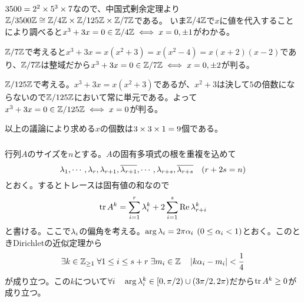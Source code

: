 \newpage

\setcounter{subsubsection}{3}
\subsubsection{} %
\begin{sol}
$3500 = 2^2 \times 5^3 \times 7$なので、中国式剰余定理より${\mathbb Z} / 3500 {\mathbb Z} \cong {\mathbb Z} / 4{\mathbb Z} \times {\mathbb Z} / 125 {\mathbb Z} \times {\mathbb Z} / 7{\mathbb Z}$である。
いま${\mathbb Z} / 4{\mathbb Z}$で$x$に値を代入することにより調べると$x^3 + 3x = 0 \in {\mathbb Z} / 4 {\mathbb Z} \iff x = 0, \pm 1$がわかる。

${\mathbb Z} / 7 {\mathbb Z}$で考えると$x^3 + 3x = x(x^2 + 3) = x(x^2 - 4)= x(x+2)(x-2)$であり、${\mathbb Z} / 7 {\mathbb Z}$は整域だから$x^3 + 3x = 0 \in {\mathbb Z} / 7 {\mathbb Z} \iff x = 0, \pm 2$が判る。

${\mathbb Z} / 125 {\mathbb Z}$で考える。$x^3 + 3x = x(x^2 + 3)$であるが、$x^2 + 3$は決して$5$の倍数にならないので${\mathbb Z} / 125 {\mathbb Z}$において常に単元である。よって$x^3 + 3x = 0 \in {\mathbb Z} / 125 {\mathbb Z} \iff x = 0$が判る。

以上の議論により求める$x$の個数は$3 \times 3 \times 1 = 9$個である。
\end{sol}

\newpage

\setcounter{subsubsection}{6}
\subsubsection{} %
\begin{sol}
  行列$A$のサイズを$n$とする。$A$の固有多項式の根を重複を込めて
  \[
  {\lambda}_1, \cdots , {\lambda}_r, {\lambda}_{r+1}, \overline{{\lambda}_{r+1}}, \cdots , {\lambda}_{r+s}, \overline{{\lambda}_{r+s}} \quad (r+2s = n)
  \]
  とおく。するとトレースは固有値の和なので
  \[
  \operatorname{tr} A^k = \sum_{i=1}^r {\lambda}_i^k + 2  \sum_{i=1}^s \operatorname{Re} {\lambda}_{r+i}^k
  \]
  と書ける。ここで${\lambda}_i$の偏角を考える。$\arg {\lambda}_i = 2\pi {\alpha}_i$ $(0 \leq {\alpha}_i < 1)$とおく。このときDirichletの近似定理から
  \[
  \exists k \in {\mathbb Z}_{\geq 1} \; \forall 1 \leq i \leq s+r \; \exists m_i \in {\mathbb Z} \quad \left \lvert k{\alpha}_i - m_i \right \rvert < \frac{1}{4}
  \]
  が成り立つ。この$k$について$\forall i \quad \arg {\lambda}_i^k \in [0, \pi/2) \cup (3\pi / 2, 2\pi)$だから$\operatorname{tr} A^k \geq 0$が成り立つ。
\end{sol}
